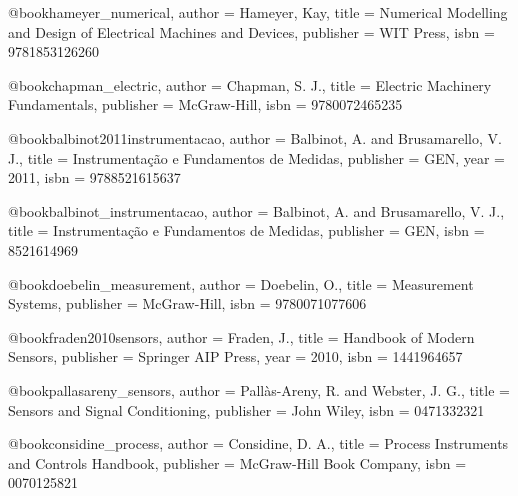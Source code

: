 @book{hameyer_numerical,
  author = {Hameyer, Kay},
  title = {Numerical Modelling and Design of Electrical Machines and Devices},
  publisher = {WIT Press},
  isbn = {9781853126260}
}

@book{chapman_electric,
  author = {Chapman, S. J.},
  title = {Electric Machinery Fundamentals},
  publisher = {McGraw-Hill},
  isbn = {9780072465235}
}

%

@book{balbinot2011instrumentacao,
  author = {Balbinot, A. and Brusamarello, V. J.},
  title = {Instrumentação e Fundamentos de Medidas},
  publisher = {GEN},
  year = {2011},
  isbn = {9788521615637}
}

@book{balbinot_instrumentacao,
  author = {Balbinot, A. and Brusamarello, V. J.},
  title = {Instrumentação e Fundamentos de Medidas},
  publisher = {GEN},
  isbn = {8521614969}
}

@book{doebelin_measurement,
  author = {Doebelin, O.},
  title = {Measurement Systems},
  publisher = {McGraw-Hill},
  isbn = {9780071077606}
}

@book{fraden2010sensors,
  author = {Fraden, J.},
  title = {Handbook of Modern Sensors},
  publisher = {Springer AIP Press},
  year = {2010},
  isbn = {1441964657}
}

@book{pallasareny_sensors,
  author = {Pallàs-Areny, R. and Webster, J. G.},
  title = {Sensors and Signal Conditioning},
  publisher = {John Wiley},
  isbn = {0471332321}
}

@book{considine_process,
  author = {Considine, D. A.},
  title = {Process Instruments and Controls Handbook},
  publisher = {McGraw-Hill Book Company},
  isbn = {0070125821}
}

